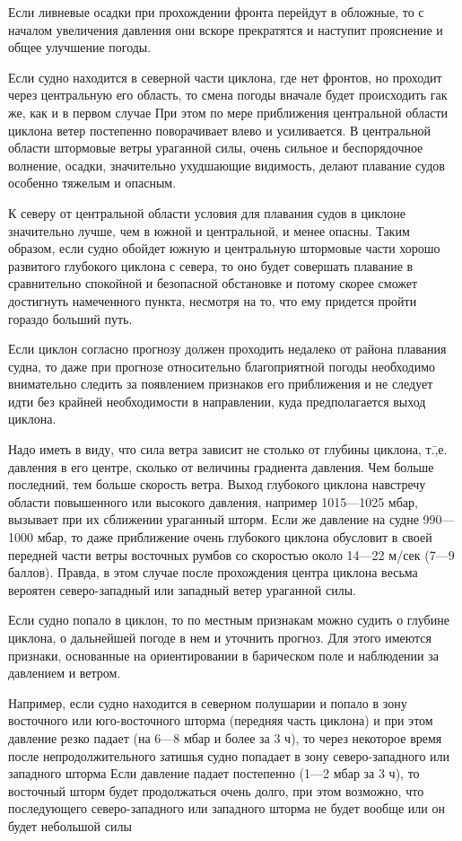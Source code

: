 Если ливневые осадки при прохождении фронта перейдут в обложные, то с началом увеличения давления они вскоре прекратятся и наступит прояснение и общее улучшение погоды.

Если судно находится в северной части циклона, где нет фронтов, но проходит через центральную его область, то смена погоды вначале будет происходить гак же, как и в первом случае При этом по мере приближения центральной области циклона ветер постепенно поворачивает влево и усиливается. В центральной области штормовые ветры ураганной силы, очень сильное и беспорядочное волнение, осадки, значительно ухудшающие видимость, делают плавание судов особенно тяжелым и опасным.

К северу от центральной области условия для плавания судов в циклоне значительно лучше, чем в южной и центральной, и менее опасны. Таким образом, если судно обойдет южную и центральную штормовые части хорошо развитого глубокого циклона с севера, то оно будет совершать плавание в сравнительно спокойной и безопасной обстановке и потому скорее сможет достигнуть намеченного пункта, несмотря на то, что ему придется пройти гораздо больший путь.

Если циклон согласно прогнозу должен проходить недалеко от района плавания судна, то даже при прогнозе относительно благоприятной погоды необходимо внимательно следить за появлением признаков его приближения и не следует идти без крайней необходимости в направлении, куда предполагается выход циклона.

Надо иметь в виду, что сила ветра зависит не столько от глубины циклона, т.\=,е. давления в его центре, сколько от величины градиента давления. Чем больше последний, тем больше скорость ветра. Выход глубокого циклона навстречу области повышенного или высокого давления, например 1015—1025 мбар, вызывает при их сближении ураганный шторм. Если же давление на судне 990—1000 мбар, то даже приближение очень глубокого циклона обусловит в своей передней части ветры восточных румбов со скоростью около 14—22 м/сек (7—9 баллов). Правда, в этом случае после прохождения центра циклона весьма вероятен северо-западный или западный ветер ураганной силы.

Если судно попало в циклон, то по местным признакам можно судить о глубине циклона, о дальнейшей погоде в нем и уточнить прогноз. Для этого имеются признаки, основанные на ориентировании в барическом поле и наблюдении за давлением и ветром.

Например, если судно находится в северном полушарии и попало в зону восточного или юго-восточного шторма (передняя часть циклона) и при этом давление резко падает (на 6—8 мбар и более за 3 ч), то через некоторое время после непродолжительного затишья судно попадает в зону северо-западного или западного шторма Если давление падает постепенно (1—2 мбар за 3 ч), то восточный шторм будет продолжаться очень долго, при этом возможно, что последующего северо-западного или западного шторма не будет вообще или он будет небольшой силы

